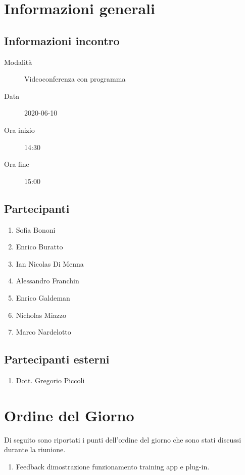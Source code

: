 \documentclass{article}
\begin{document}


\section{Informazioni generali}%
\label{sec:informazioni_generali}

\subsection{Informazioni incontro}%
\label{sub:informazioni_incontro}

\begin{description}
  \item[Modalità] Videoconferenza con programma 
  \item[Data] 2020-06-10
  \item[Ora inizio] 14:30
  \item[Ora fine] 15:00
\end{description}

\subsection{Partecipanti}%
\label{sub:partecipanti}

\begin{enumerate}
  \item Sofia Bononi
  \item Enrico Buratto
  \item Ian Nicolas Di Menna
  \item Alessandro Franchin
  \item Enrico Galdeman
  \item Nicholas Miazzo
  \item Marco Nardelotto
\end{enumerate}

\subsection{Partecipanti esterni}%
\label{sub:partecipanti esterni}

\begin{enumerate}
    \item Dott. Gregorio Piccoli
\end{enumerate}


\section{Ordine del Giorno}%
\label{ordine_del_giorno}
Di seguito sono riportati i punti dell'ordine del giorno che sono stati discussi durante la riunione.
\begin{enumerate}
  \item Feedback dimostrazione funzionamento training app e plug-in.
\end{enumerate}
\end{document}
